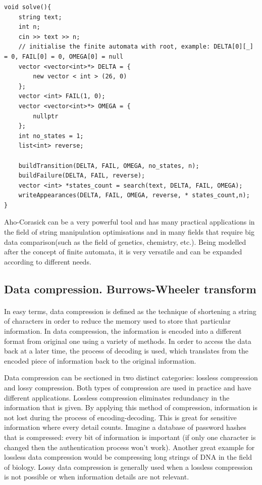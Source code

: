 \documentclass[letterpaper]{article}
\begin{document}
\begin{lstlisting}
void solve(){
    string text;
    int n;
    cin >> text >> n;
    // initialise the finite automata with root, example: DELTA[0][_] = 0, FAIL[0] = 0, OMEGA[0] = null
    vector <vector<int>*> DELTA = {
        new vector < int > (26, 0)
    };
    vector <int> FAIL(1, 0);
    vector <vector<int>*> OMEGA = {
        nullptr
    };
    int no_states = 1;
    list<int> reverse;

    buildTransition(DELTA, FAIL, OMEGA, no_states, n);
    buildFailure(DELTA, FAIL, reverse);
    vector <int> *states_count = search(text, DELTA, FAIL, OMEGA);
    writeAppearances(DELTA, FAIL, OMEGA, reverse, * states_count,n);
}
\end{lstlisting}

Aho-Corasick can be a very powerful tool and has many practical applications in the field of string manipulation optimisations and in many fields that require big data comparison(such as the field of genetics, chemistry, etc.). Being modelled after the concept of finite automata, it is very versatile and can be expanded according to different needs.

\newpage

\subsection{Data compression. Burrows-Wheeler transform}

\paragraph{}

In easy terms, data compression is defined as the technique of shortening a string of characters in order to reduce the memory used to store that particular information. In data compression, the information is encoded into a different format from original one using a variety of methods. In order to access the data back at a later time, the process of decoding is used, which translates from the encoded piece of information back to the original information. 

Data compression can be sectioned in two distinct categories: lossless compression and lossy compression. Both types of compression are used in practice and have different applications.
Lossless compression eliminates redundancy in the information that is given. By applying this method of compression, information is not lost during the process of encoding-decoding. This is great for sensitive information where every detail counts. Imagine a database of password hashes that is compressed: every bit of information is important (if only one character is changed then the authentication process won't work). Another great example for lossless data compression would be compressing long strings of DNA in the field of biology. Lossy data compression is generally used when a lossless compression is not possible or when information details are not relevant.
\end{document}
